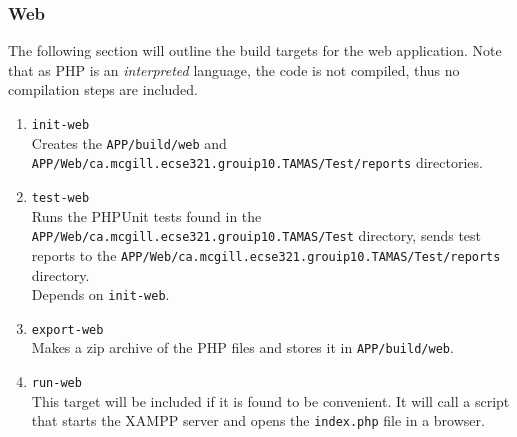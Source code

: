 \documentclass[12pt]{report}
\begin{document}
\subsubsection{Web}
The following section will outline the build targets for the web application. Note that as PHP is an
\textit{interpreted} language, the code is not compiled, thus no compilation steps are included.
\begin{enumerate}
	\item \texttt{init-web}\\
		Creates the \texttt{APP/build/web} and
		\texttt{APP/Web/ca.mcgill.ecse321.grouip10.TAMAS/Test/reports} directories.
	\item \texttt{test-web}\\
		Runs the PHPUnit tests found in
		the \texttt{APP/Web/ca.mcgill.ecse321.grouip10.TAMAS/Test} directory, sends test reports to
		the \texttt{APP/Web/ca.mcgill.ecse321.grouip10.TAMAS/Test/reports} directory.\\
		Depends on \texttt{init-web}.
	\item \texttt{export-web}\\
		Makes a zip archive of the PHP files and stores it in \texttt{APP/build/web}.
	\item \texttt{run-web}\\
		This target will be included if it is found to be convenient. It will call a script that
		starts the XAMPP server and opens the \texttt{index.php} file in a browser.
\end{enumerate}
\end{document}
